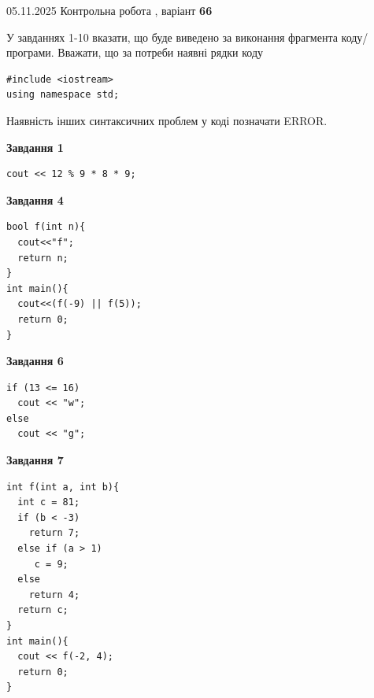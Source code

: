 \documentclass[12pt, ukrainian]{article}
\begin{document}
{\Large{05.11.2025 Контрольна робота , варіант  \No \textbf { 66 }\par}}
{
\begin {large}
У завданнях 1-10 вказати, що буде виведено за виконання фрагмента коду/про\-гра\-ми.
Вважати, що за потреби наявні рядки коду
\begin{verbatim}
#include <iostream>
using namespace std;
\end{verbatim}
Наявність інших синтаксичних проблем у коді позначати ERROR.

\begin{minipage}[t]{7.0cm}

\begin{center}
\textbf{Завдання 1}
\end{center}
\vspace{-8mm}

\begin{verbatim}
cout << 12 % 9 * 8 * 9;
\end{verbatim}



\begin{center}
\textbf{Завдання 4}
\end{center}
\vspace{-8mm}

\begin{verbatim}
bool f(int n){
  cout<<"f";
  return n;
}
int main(){
  cout<<(f(-9) || f(5));
  return 0;
}
\end{verbatim}



\begin{center}
\textbf{Завдання 6}
\end{center}
\vspace{-8mm}

\begin{verbatim}
if (13 <= 16)
  cout << "w";
else
  cout << "g";
\end{verbatim}



\begin{center}
\textbf{Завдання 7}
\end{center}
\vspace{-8mm}

\begin{verbatim}
int f(int a, int b){
  int c = 81;
  if (b < -3)
    return 7;
  else if (a > 1)
     c = 9;
  else
    return 4;
  return c;
}
int main(){
  cout << f(-2, 4);
  return 0;
}
\end{verbatim}


\end{minipage}
\end{large}}
\end{document}
